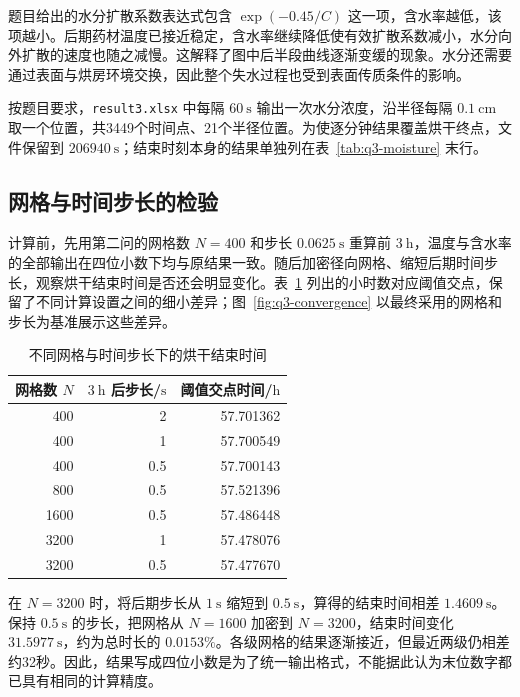 题目给出的水分扩散系数表达式包含 $\exp(-0.45/C)$ 这一项，含水率越低，该项越小。后期药材温度已接近稳定，含水率继续降低使有效扩散系数减小，水分向外扩散的速度也随之减慢。这解释了图中后半段曲线逐渐变缓的现象。水分还需要通过表面与烘房环境交换，因此整个失水过程也受到表面传质条件的影响。

按题目要求，\texttt{result3.xlsx} 中每隔 $60~\mathrm s$ 输出一次水分浓度，沿半径每隔 $0.1~\mathrm{cm}$ 取一个位置，共3449个时间点、21个半径位置。为使逐分钟结果覆盖烘干终点，文件保留到 $206940~\mathrm s$；结束时刻本身的结果单独列在表~\ref{tab:q3-moisture} 末行。

\subsection{网格与时间步长的检验}

计算前，先用第二问的网格数 $N=400$ 和步长 $0.0625~\mathrm s$ 重算前 $3~\mathrm h$，温度与含水率的全部输出在四位小数下均与原结果一致。随后加密径向网格、缩短后期时间步长，观察烘干结束时间是否还会明显变化。表~\ref{tab:q3-convergence} 列出的小时数对应阈值交点，保留了不同计算设置之间的细小差异；图~\ref{fig:q3-convergence} 以最终采用的网格和步长为基准展示这些差异。

\begin{table}[H]
 \centering
 \caption{不同网格与时间步长下的烘干结束时间}
 \label{tab:q3-convergence}
 \begin{tabular}{rrr}
  \toprule
  网格数 $N$ & $3~\mathrm h$ 后步长/$\mathrm s$ & 阈值交点时间/$\mathrm h$\\
  \midrule
  400 & 2   & 57.701362\\
  400 & 1   & 57.700549\\
  400 & 0.5 & 57.700143\\
  800 & 0.5 & 57.521396\\
  1600 & 0.5 & 57.486448\\
  3200 & 1 & 57.478076\\
  3200 & 0.5 & 57.477670\\
  \bottomrule
 \end{tabular}
\end{table}

在 $N=3200$ 时，将后期步长从 $1~\mathrm s$ 缩短到 $0.5~\mathrm s$，算得的结束时间相差 $1.4609~\mathrm s$。保持 $0.5~\mathrm s$ 的步长，把网格从 $N=1600$ 加密到 $N=3200$，结束时间变化 $31.5977~\mathrm s$，约为总时长的 $0.0153\%$。各级网格的结果逐渐接近，但最近两级仍相差约32秒。因此，结果写成四位小数是为了统一输出格式，不能据此认为末位数字都已具有相同的计算精度。

